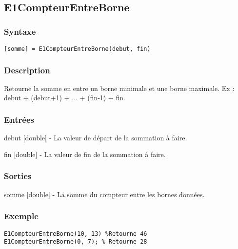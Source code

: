 \begin{minipage}{\linewidth}
\subsection*{E1CompteurEntreBorne}
\subsubsection*{Syntaxe}
\begin{lstlisting}
[somme] = E1CompteurEntreBorne(debut, fin)
\end{lstlisting}
\subsubsection*{Description}
Retourne la somme en entre un borne minimale et une borne maximale. Ex : debut + (debut+1) + ... + (fin-1) + fin.
\subsubsection*{Entrées}
\begin{description}
\item debut [double] - La valeur de départ de la sommation à faire. 
\item fin [double] - La valeur de fin de la sommation à faire. 
\end{description} \subsubsection*{Sorties}
\begin{description}
\item somme [double] - La somme du compteur entre les bornes données. 
\end{description} 
\subsubsection*{Exemple}
\begin{lstlisting}
E1CompteurEntreBorne(10, 13) %Retourne 46 
E1CompteurEntreBorne(0, 7); % Retourne 28
\end{lstlisting} \medskip
\end{minipage}